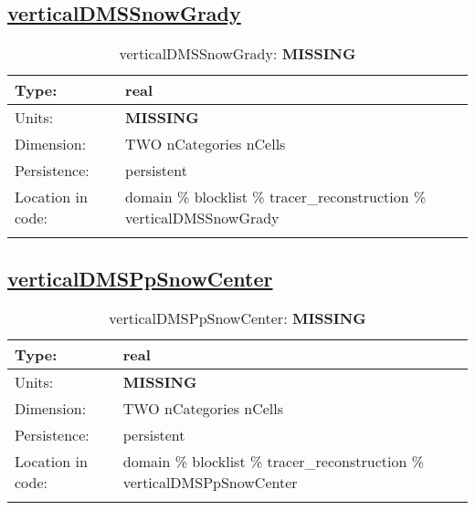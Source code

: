 \subsection[verticalDMSSnowGrady]{\hyperref[sec:var_tab_tracer_reconstruction]{verticalDMSSnowGrady}}
\label{subsec:var_sec_tracer_reconstruction_verticalDMSSnowGrady}
\begin{center}
\begin{longtable}{| p{2.0in} | p{4.0in} |}
        \hline 
        Type: & real \\
        \hline 
        Units: & {\bf \color{red} MISSING} \\
        \hline 
        Dimension: & TWO nCategories nCells \\
        \hline 
        Persistence: & persistent \\
        \hline 
         Location in code: & domain \% blocklist \% tracer\_reconstruction \% verticalDMSSnowGrady \\
         \hline 
    \caption{verticalDMSSnowGrady: {\bf \color{red} MISSING}}
\end{longtable}
\end{center}
\subsection[verticalDMSPpSnowCenter]{\hyperref[sec:var_tab_tracer_reconstruction]{verticalDMSPpSnowCenter}}
\label{subsec:var_sec_tracer_reconstruction_verticalDMSPpSnowCenter}
\begin{center}
\begin{longtable}{| p{2.0in} | p{4.0in} |}
        \hline 
        Type: & real \\
        \hline 
        Units: & {\bf \color{red} MISSING} \\
        \hline 
        Dimension: & TWO nCategories nCells \\
        \hline 
        Persistence: & persistent \\
        \hline 
         Location in code: & domain \% blocklist \% tracer\_reconstruction \% verticalDMSPpSnowCenter \\
         \hline 
    \caption{verticalDMSPpSnowCenter: {\bf \color{red} MISSING}}
\end{longtable}
\end{center}
